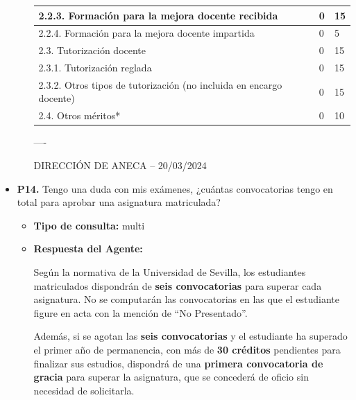 \documentclass{article}
\begin{document}
\begin{itemize}
\begin{itemize}
\begin{scriptsize}
\begin{table}[h!]
\begin{tabular}{|p{}|p{}|p{}|}
                      2.2.3. Formación para la mejora docente recibida                    & 0             & 15            \\\hline
                      2.2.4. Formación para la mejora docente impartida                   & 0             & 5             \\\hline
                      2.3. Tutorización docente                                           & 0             & 15            \\\hline
                      2.3.1. Tutorización reglada                                         & 0             & 15            \\\hline
                      2.3.2. Otros tipos de tutorización (no incluida en encargo docente) & 0             & 15            \\\hline
                      2.4. Otros méritos*                                                 & 0             & 10            \\\hline
                    \end{tabular}\end{table}
                  \vspace{0.4cm}

                  ----

                  DIRECCIÓN DE ANECA – 20/03/2024
                \end{scriptsize}
        \end{itemize}


  \item \textbf{P14.} Tengo una duda con mis exámenes, ¿cuántas convocatorias tengo en total para aprobar una asignatura matriculada? \\
        \begin{itemize}
          \item \textbf{Tipo de consulta:} multi
          \item \textbf{Respuesta del Agente:}

                Según la normativa de la Universidad de Sevilla, los estudiantes matriculados dispondrán de \textbf{seis convocatorias} para superar cada asignatura. No se computarán las convocatorias en las que el estudiante figure en acta con la mención de “No Presentado”.

                Además, si se agotan las \textbf{seis convocatorias} y el estudiante ha superado el primer año de permanencia, con más de \textbf{30 créditos} pendientes para finalizar sus estudios, dispondrá de una \textbf{primera convocatoria de gracia} para superar la asignatura, que se concederá de oficio sin necesidad de solicitarla.


\end{itemize}
\end{itemize}
\end{document}
